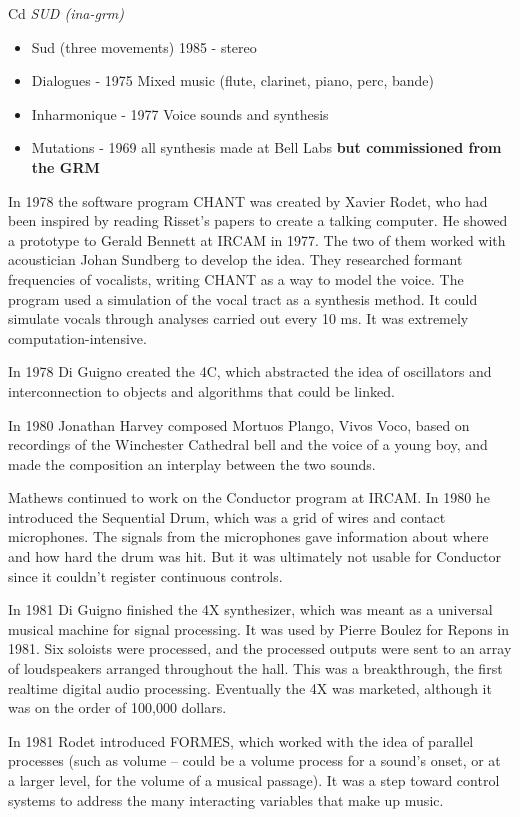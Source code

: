 Cd \textit{SUD (ina-grm)}
\begin{itemize}
\item Sud (three movements) 1985 - stereo
\item Dialogues - 1975 Mixed music (flute, clarinet, piano, perc, bande)
\item Inharmonique - 1977 Voice sounds and synthesis
\item Mutations - 1969 all synthesis made at Bell Labs \textbf{but commissioned from the GRM}
\end{itemize}



In 1978 the software program CHANT was created by Xavier Rodet, who had been inspired by reading Risset's papers to create a talking computer. He showed a prototype to Gerald Bennett at IRCAM in 1977. The two of them worked with acoustician Johan Sundberg to develop the idea. They researched formant frequencies of vocalists, writing CHANT as a way to model the voice. The program used a simulation of the vocal tract as a synthesis method. It could simulate vocals through analyses carried out every 10 ms. It was extremely computation-intensive.

In 1978 Di Guigno created the 4C, which abstracted the idea of oscillators and interconnection to objects and algorithms that could be linked.

In 1980 Jonathan Harvey composed Mortuos Plango, Vivos Voco, based on recordings of the Winchester Cathedral bell and the voice of a young boy, and made the composition an interplay between the two sounds.

Mathews continued to work on the Conductor program at IRCAM. In 1980 he introduced the Sequential Drum, which was a grid of wires and contact microphones. The signals from the microphones gave information about where and how hard the drum was hit. But it was ultimately not usable for Conductor since it couldn't register continuous controls.

In 1981 Di Guigno finished the 4X synthesizer, which was meant as a universal musical machine for signal processing. It was used by Pierre Boulez for Repons in 1981. Six soloists were processed, and the processed outputs were sent to an array of loudspeakers arranged throughout the hall. This was a breakthrough, the first realtime digital audio processing. Eventually the 4X was marketed, although it was on the order of 100,000 dollars.

In 1981 Rodet introduced FORMES, which worked with the idea of parallel processes (such as volume -- could be a volume process for a sound's onset, or at a larger level, for the volume of a musical passage). It was a step toward control systems to address the many interacting variables that make up music.

